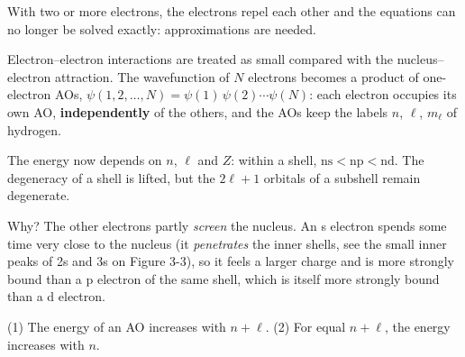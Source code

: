 With two or more electrons, the electrons repel each other and the equations can no longer be solved
exactly: approximations are needed.
\begin{concept}
Electron--electron interactions are treated as small compared with the nucleus--electron
attraction. The wavefunction of $N$ electrons becomes a product of one-electron AOs,
$\psi(1,2,\dots,N) = \psi(1)\,\psi(2)\cdots\psi(N)$: each electron occupies its own AO,
\textbf{independently} of the others, and the AOs keep the labels $n$, $\ell$, $m_\ell$ of hydrogen.
\end{concept}
\begin{concept}
The energy now depends on $n$, $\ell$ and $Z$: within a shell, $\mathrm{ns} < \mathrm{np} < \mathrm{nd}$.
The degeneracy of a shell is lifted, but the $2\ell+1$ orbitals of a subshell remain degenerate.
\end{concept}
Why? The other electrons partly \emph{screen} the nucleus. An s electron spends some time very close to
the nucleus (it \emph{penetrates} the inner shells, see the small inner peaks of 2s and 3s on Figure 3-3),
so it feels a larger charge and is more strongly bound than a p electron of the same shell, which is
itself more strongly bound than a d electron.
\begin{concept}
(1) The energy of an AO increases with $n + \ell$. (2) For equal $n + \ell$, the energy increases with $n$.
\end{concept}
